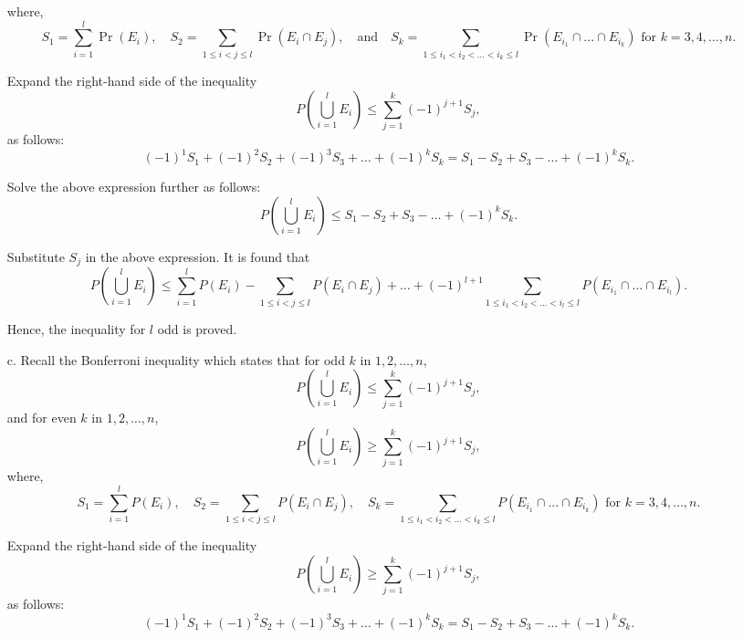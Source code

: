 \documentclass{article}
\begin{document}
\begin{enumerate}
  where,
\begin{equation*}
S_1 = \sum_{i=1}^{l} \Pr(E_i), \quad S_2 = \sum_{1 \leq i < j \leq l} \Pr(E_i \cap E_j), \quad \text{and} \quad S_k = \sum_{1 \leq i_1 < i_2 < \dots < i_k \leq l} \Pr(E_{i_1}\cap...\cap E_{i_k}) \text{ for } k = 3,4,\ldots,n.
\end{equation*}

Expand the right-hand side of the inequality
\begin{equation*}
P\left(\bigcup_{i=1}^{l} E_i\right) \leq \sum_{j=1}^{k} (-1)^{j+1} S_j,
\end{equation*}
as follows:
\begin{equation*}
(-1)^1 S_1 + (-1)^2 S_2 + (-1)^3 S_3 + \ldots + (-1)^k S_k = S_1 - S_2 + S_3 - \ldots + (-1)^k S_k.
\end{equation*}

Solve the above expression further as follows:
\begin{equation*}
P\left(\bigcup_{i=1}^{l} E_i\right) \leq S_1 - S_2 + S_3 - \ldots + (-1)^k S_k.
\end{equation*}

Substitute \( S_j \) in the above expression. It is found that
\begin{equation*}
P\left(\bigcup_{i=1}^{l} E_i\right) \leq \sum_{i=1}^{l} P(E_i) - \sum_{1 \leq i < j \leq l} P(E_i \cap E_j) + \ldots + (-1)^{l+1} \sum_{1 \leq i_1 < i_2 < \dots < i_l \leq l} P\left(E_{i_1}\cap...\cap E_{i_l}\right).
\end{equation*}

Hence, the inequality for \( l \) odd is proved.
\item[c.] Recall the Bonferroni inequality which states that for odd \( k \) in \( 1,2,\ldots,n \),
\begin{equation*}
P\left(\bigcup_{i=1}^{l} E_i\right) \leq \sum_{j=1}^{k} (-1)^{j+1} S_j,
\end{equation*}
and for even \( k \) in \( 1,2,\ldots,n \),
\begin{equation*}
P\left(\bigcup_{i=1}^{l} E_i\right) \geq \sum_{j=1}^{k} (-1)^{j+1} S_j,
\end{equation*}
where,
\begin{equation*}
S_1 = \sum_{i=1}^{l} P(E_i), \quad S_2 = \sum_{1 \leq i < j \leq l} P(E_i \cap E_j), \quad S_k = \sum_{1 \leq i_1 < i_2 < \dots < i_k \leq l} P\left(E_{i_1}\cap...\cap E_{i_k}\right) \text{ for } k = 3,4,\ldots,n.
\end{equation*}

Expand the right-hand side of the inequality
\begin{equation*}
P\left(\bigcup_{i=1}^{l} E_i\right) \geq \sum_{j=1}^{k} (-1)^{j+1} S_j,
\end{equation*}
as follows:
\begin{equation*}
(-1)^1 S_1 + (-1)^2 S_2 + (-1)^3 S_3 + \ldots + (-1)^k S_k = S_1 - S_2 + S_3 - \ldots + (-1)^k S_k.
\end{equation*}


\end{enumerate}
\end{document}
